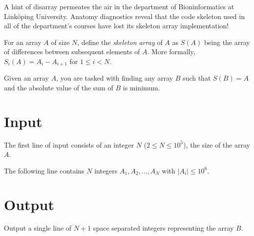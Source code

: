 


A hint of disarray permeates the air in the department of Bioninformatics at Linköping University. 
Anatomy diagnostics reveal that the code skeleton used in all of the department's courses have lost its
skeleton array implementation!

For an array $A$ of size $N$, define the \textit{skeleton array} of $A$ as $S(A)$ being the array of differences between subsequent elements of $A$. 
More formally, $S_i(A) = A_{i} - A_{i+1}$ for $1 \leq i < N$.




Given an array $A$, you are tasked with finding any array $B$ such that $S(B) = A$ and the absolute value of the sum of $B$ is minimum. 



\section*{Input}
The first line of input consists of an integer $N$ ($2 \leq N \leq 10^5$), the size of the array $A$.

The following line contains $N$ integers $A_1, A_2, ..., A_N$ with $|A_i| \leq 10^6$.

\section*{Output}
Output a single line of $N+1$ space separated integers representing the array $B$.
